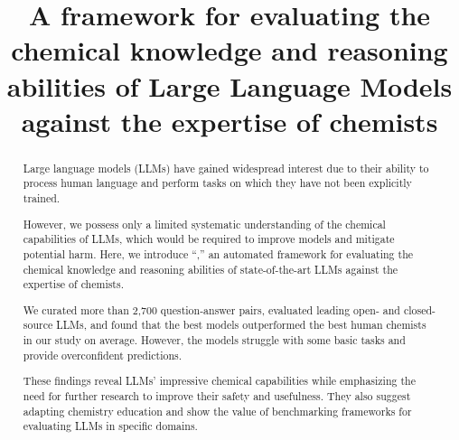 \documentclass[11pt, oneside]{article}
\title{\textsf{A framework for evaluating the chemical knowledge and reasoning abilities of Large Language Models against the expertise of chemists}}
\begin{document}
\maketitle

\clearpage
\begin{abstract}
Large language models (LLMs) have gained widespread interest due to their ability to process human language and perform tasks on which they have not been explicitly trained.

However, we possess only a limited systematic understanding of the chemical capabilities of LLMs, which would be required to improve models and mitigate potential harm.
Here, we introduce \enquote{\chembench,} an automated framework for evaluating the chemical knowledge and reasoning abilities of state-of-the-art LLMs against the expertise of chemists.

We curated more than 2,700 question-answer pairs, evaluated leading open- and closed-source LLMs, and found that the best models outperformed the best human chemists in our study on average.
However, the models struggle with some basic tasks and provide overconfident predictions.

These findings reveal LLMs' impressive chemical capabilities while emphasizing the need for further research to improve their safety and usefulness. They also suggest adapting chemistry education and show the value of benchmarking frameworks for evaluating LLMs in specific domains.
\end{abstract}
\end{document}
